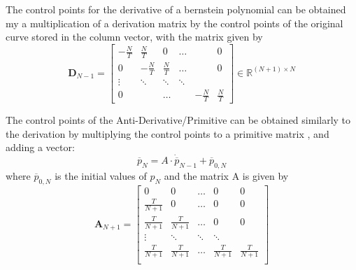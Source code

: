 \par The control points for the derivative of a bernstein polynomial can be obtained my a multiplication of a derivation matrix by the control points of the original curve stored in the column vector, with the matrix given by 
\begin{equation}
    \boldsymbol{D}_{N-1} = 
    \begin{bmatrix}
        -\frac{N}{T} & \frac{N}{T} & 0 & \ldots & & 0 \\
        0 & -\frac{N}{T} & \frac{N}{T} & \ldots & & 0 \\
        \vdots &  \ddots & \ddots & \ddots & &   \\
        0 & & \ldots & & -\frac{N}{T} & \frac{N}{T}
    \end{bmatrix} \in \mathbb{R}^{(N+1)\times N}
    \label{eq:bernderivmat}
\end{equation}

\par The control points of the Anti-Derivative/Primitive can be obtained similarly to the derivation by multiplying the control points to a primitive matrix \cite{privateconversationprimitive}, and adding a vector:
\begin{equation}
    \overline{p}_N = A \cdot \dot{\overline{p}}_{N-1}  + \overline{p}_{0,N}
\end{equation}
where $\overline{p}_{0,N}$ is the initial values of $p_N$ and the matrix A is given by 
\begin{equation}
    \boldsymbol{A}_{N+1} = \begin{bmatrix}
        0 & 0 & \ldots & 0 & 0 \\
        \frac{T}{N+1} & 0 & \ldots & 0 & 0 \\
        \frac{T}{N+1} & \frac{T}{N+1} & \ldots & 0 & 0 \\
        \vdots & \ddots & \ddots & \ddots & \\
        \frac{T}{N+1} & \frac{T}{N+1} & \ldots & \frac{T}{N+1} & \frac{T}{N+1} \\
    \end{bmatrix}
\end{equation}

